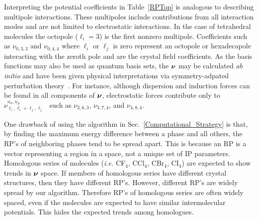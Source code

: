\documentclass[preprint]{revtex4}
\newcommand{\mb}[1]{\ensuremath{\mbox{\boldmath $ #1 $}}}
\begin{document}
Interpreting the potential coefficients in Table~\ref{RPTop} is
analogous to describing multipole interactions. These multipoles
include contributions from all interaction modes and are not limited
to electrostatic  interactions. In the case of tetrahedral molecules
the octopole ($\ell_i=3$) is the first nonzero multipole.
Coefficients such as $\nu_{0,3,3}$ and $\nu_{0,4,4}$ where $\ell_i$
or $\ell_j$ is zero represent an octopole or hexadecapole
interacting with the zeroth pole and are the crystal field
coefficients. As the basis functions may also be used as quantum
basis sets, the $\mb{\nu}$ may be calculated \emph{ab initio} and
have been given physical interpretations via symmetry-adpated
perturbation theory~\cite{Avoird94}.  For instance, although
dispersion and induction forces can be found in all components of
$\mb{\nu}$, electrostatic forces contribute only to
$\nu^{n_\sigma,n_\mu}_{\ell_i,\ell_i+\ell_j,\ell_j}$~\cite{Stone84}
such as $\nu_{3,6,3}$, $\nu_{3,7,4}$, and $\nu_{4,8,4}$.

One drawback of using the algorithm in
Sec.~\ref{Computational_Strategy} is that, by finding the maximum
energy difference between a phase and all others, the RP's of
neighboring phases tend to be spread apart.  This is because an RP
is a vector representing a region in a space, not a unique set of IP
parameters.  Homologous series of molecules (\emph{i.e.} CF$_4$,
CCl$_4$, CBr$_4$, CI$_4$) are expected to show trends in $\mb{\nu}$
space. If members of homologous series have different crystal
structures, then they have different RP's. However, different RP's
are widely spread by our algorithm. Therefore RP's of homologous
series are often widely spaced, even if the molecules are expected
to have similar intermolecular potentials. This hides the expected
trends among homologues.
\end{document}
